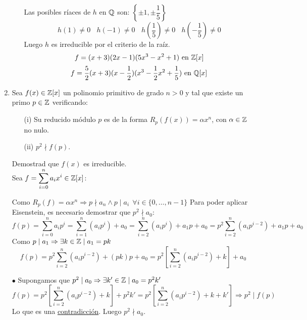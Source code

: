 \documentclass[12pt]{article}
\begin{document}
\begin{ejercicio}[3.5 puntos]
\begin{enumerate}
\begin{enumerate}
                    \noindent
                    Las posibles ríaces de $h$ en $\mathbb{Q}$ son: $\left\{ \pm 1, \pm \dfrac{1}{5} \right\}$
                    $$h(1) \neq 0~~~~h(-1)\neq 0~~~~h\left(\dfrac{1}{5}\right) \neq 0 ~~~~h\left(-\dfrac{1}{5}\right) \neq 0$$
                    Luego $h$ es irreducible por el criterio de la raíz.\\
                    $$f = (x+3)(2x-1)(5x^3-x^2+1) \mbox{ en } \mathbb{Z}[x]$$
                    $$f = \dfrac{5}{2}(x+3)(x-\dfrac{1}{2})(x^3-\dfrac{1}{2}x^2+\dfrac{1}{5}) \mbox{ en } \mathbb{Q}[x]$$

                    


            \end{enumerate}
            \item Sea $f(x) \in \mathbb{Z}[x]$ un polinomio primitivo de grado $n>0$ y tal que existe un primo $p \in \mathbb{Z}$ verificando:
                \begin{enumerate}
                    \item[(i)] Su reducido módulo $p$ es de la forma $R_p(f(x)) = \alpha x^n$, con $\alpha \in \mathbb{Z}$ no nulo.
                    \item[(ii)] $p^2 \nmid f(p)$. 
                \end{enumerate}
                Demostrad que $f(x)$ es irreducible.\\

                \noindent
                Sea $f = \displaystyle\sum_{i=0}^n a_i x^i \in \mathbb{Z}[x]$:

                \noindent
                Como $R_p(f) = \alpha x^n \Rightarrow p \nmid a_n \land p \mid a_i~~\forall i \in \{0, \ldots, n-1\}$\newline
                Para poder aplicar Eisenstein, es necesario demostrar que $p^2 \nmid a_0$:\\

                \noindent
                $$f(p) = \displaystyle \sum_{i=0}^n a_i p^i = \sum_{i=1}^n (a_i p^i) + a_0 = \sum_{i=2}^n (a_i p^i) + a_1 p + a_0 = p^2 \sum_{i=2}^n (a_i p^{i-2}) + a_1 p + a_0$$
                Como $p\mid a_1\Rightarrow \exists k \in \mathbb{Z} \mid a_1 = pk$
                $$f(p) = p^2 \displaystyle\sum_{i=2}^n (a_i p^{i-2}) + (pk)p+a_0 = p^2 \left[\sum_{i=2}^n (a_i p^{i-2}) + k \right] + a_0$$

                \noindent
                $\bullet$ Supongamos que $p^2 \mid a_0 \Rightarrow \exists k' \in \mathbb{Z} \mid a_0 = p^2 k'$ 
            $$f(p) = p^2 \left[\sum_{i=2}^n(a_ip^{i-2})+k\right] + p^2 k' = p^2 \left[\sum_{i=2}^n (a_i p^{i-2})+k+k'\right] \Rightarrow p^2 \mid f(p)$$
            Lo que es una \underline{contradicción}. Luego $p^2 \nmid a_0$.\\


\end{enumerate}
\end{ejercicio}
\end{document}
